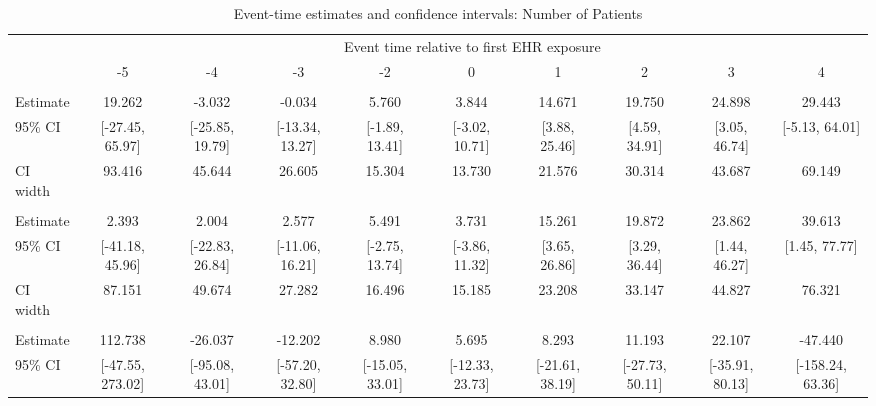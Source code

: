 
\begin{landscape}\begin{table}[!h]
\centering
\caption{\label{tab:ci_npi_unq_benes}Event-time estimates and confidence intervals: Number of Patients}
\centering
\fontsize{9}{11}\selectfont
\begin{tabular}[t]{lccccccccc}
\toprule
\multicolumn{1}{c}{ } & \multicolumn{9}{c}{Event time relative to first EHR exposure} \\
\cmidrule(l{3pt}r{3pt}){2-10}
 & -5 & -4 & -3 & -2 & 0 & 1 & 2 & 3 & 4\\
\midrule
\addlinespace[0.3em]
\multicolumn{10}{l}{\textbf{All}}\\
\hspace{1em}Estimate & 19.262 & -3.032 & -0.034 & 5.760 & 3.844 & 14.671 & 19.750 & 24.898 & 29.443\\
\hspace{1em}95\% CI & {}[-27.45, 65.97] & {}[-25.85, 19.79] & {}[-13.34, 13.27] & {}[-1.89, 13.41] & {}[-3.02, 10.71] & {}[3.88, 25.46] & {}[4.59, 34.91] & {}[3.05, 46.74] & {}[-5.13, 64.01]\\
\hspace{1em}CI width & 93.416 & 45.644 & 26.605 & 15.304 & 13.730 & 21.576 & 30.314 & 43.687 & 69.149\\
\addlinespace[0.3em]
\multicolumn{10}{l}{\textbf{Age $<$ 60}}\\
\hspace{1em}Estimate & 2.393 & 2.004 & 2.577 & 5.491 & 3.731 & 15.261 & 19.872 & 23.862 & 39.613\\
\hspace{1em}95\% CI & {}[-41.18, 45.96] & {}[-22.83, 26.84] & {}[-11.06, 16.21] & {}[-2.75, 13.74] & {}[-3.86, 11.32] & {}[3.65, 26.86] & {}[3.29, 36.44] & {}[1.44, 46.27] & {}[1.45, 77.77]\\
\hspace{1em}CI width & 87.151 & 49.674 & 27.282 & 16.496 & 15.185 & 23.208 & 33.147 & 44.827 & 76.321\\
\addlinespace[0.3em]
\multicolumn{10}{l}{\textbf{Age $\geq$ 60}}\\
\hspace{1em}Estimate & 112.738 & -26.037 & -12.202 & 8.980 & 5.695 & 8.293 & 11.193 & 22.107 & -47.440\\
\hspace{1em}95\% CI & {}[-47.55, 273.02] & {}[-95.08, 43.01] & {}[-57.20, 32.80] & {}[-15.05, 33.01] & {}[-12.33, 23.73] & {}[-21.61, 38.19] & {}[-27.73, 50.11] & {}[-35.91, 80.13] & {}[-158.24, 63.36]\\

\end{tabular}
\end{table}
\end{landscape}
